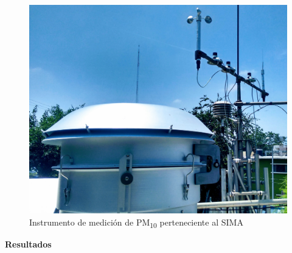 \documentclass{article}
\begin{document}
\begin{minipage}{0.25\linewidth}
    \begin{figure}[H]
        \centering
    \includegraphics[scale=0.06]{images/mediciones.jpg}
    \caption{ Instrumento de medición de PM\textsubscript{10} perteneciente al SIMA}
    \end{figure}
\end{minipage}
\begin{center}
\begin{shaded}
\textbf{\textcolor{ver}{Resultados}}
\end{shaded}
\end{center}
\vspace{-0.8cm}
\end{document}
